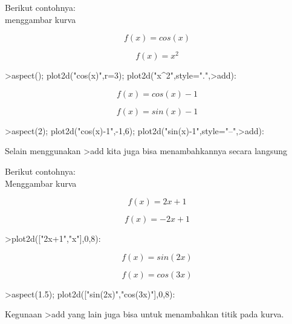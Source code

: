 \documentclass{article}
\begin{document}
\begin{eulernotebook}
\begin{eulercomment}
\begin{eulercomment}
\begin{eulercomment}
\begin{eulercomment}
\begin{eulercomment}
Berikut contohnya:\\
menggambar kurva\\
\end{eulercomment}
\begin{eulerformula}
\[
 f(x)=cos(x)
\]
\end{eulerformula}
\begin{eulerformula}
\[
f(x)= x^2
\]
\end{eulerformula}
\begin{eulerprompt}
>aspect(); plot2d("cos(x)",r=3); plot2d("x^2",style=".",>add):
\end{eulerprompt}
\begin{eulerformula}
\[
f(x)=cos(x)-1
\]
\end{eulerformula}
\begin{eulerformula}
\[
f(x)= sin(x)-1
\]
\end{eulerformula}
\begin{eulerprompt}
>aspect(2); plot2d("cos(x)-1",-1,6); plot2d("sin(x)-1",style="--",>add):
\end{eulerprompt}
\begin{eulercomment}
Selain menggunakan \textgreater{}add kita juga bisa menambahkannya secara langsung

Berikut contohnya:\\
Menggambar kurva\\
\end{eulercomment}
\begin{eulerformula}
\[
f(x)= 2x+1
\]
\end{eulerformula}
\begin{eulerformula}
\[
f(x)= -2x+1
\]
\end{eulerformula}
\begin{eulerprompt}
>plot2d(["2x+1","x"],0,8):
\end{eulerprompt}
\begin{eulerformula}
\[
f(x)=sin(2x)
\]
\end{eulerformula}
\begin{eulerformula}
\[
f(x)=cos(3x)
\]
\end{eulerformula}
\begin{eulerprompt}
>aspect(1.5); plot2d(["sin(2x)","cos(3x)"],0,8):
\end{eulerprompt}
\begin{eulercomment}
Kegunaan \textgreater{}add yang lain juga bisa untuk menambahkan titik pada kurva.


\end{eulercomment}
\end{eulercomment}
\end{eulercomment}
\end{eulercomment}
\end{eulercomment}
\end{eulernotebook}
\end{document}
